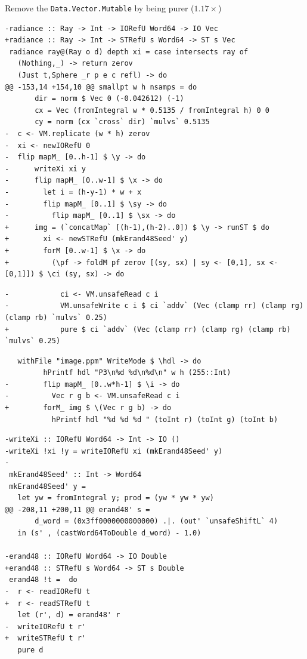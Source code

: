 \documentclass[8pt]{beamer}
\begin{document}


\begin{frame}[fragile]{Remove the \texttt{Data.Vector.Mutable} by being purer ($1.17\times$)}
\begin{verbatim}
-radiance :: Ray -> Int -> IORefU Word64 -> IO Vec
+radiance :: Ray -> Int -> STRefU s Word64 -> ST s Vec
 radiance ray@(Ray o d) depth xi = case intersects ray of
   (Nothing,_) -> return zerov
   (Just t,Sphere _r p e c refl) -> do
@@ -153,14 +154,10 @@ smallpt w h nsamps = do
       dir = norm $ Vec 0 (-0.042612) (-1)
       cx = Vec (fromIntegral w * 0.5135 / fromIntegral h) 0 0
       cy = norm (cx `cross` dir) `mulvs` 0.5135
-  c <- VM.replicate (w * h) zerov
-  xi <- newIORefU 0
-  flip mapM_ [0..h-1] $ \y -> do
-      writeXi xi y
-      flip mapM_ [0..w-1] $ \x -> do
-        let i = (h-y-1) * w + x
-        flip mapM_ [0..1] $ \sy -> do
-          flip mapM_ [0..1] $ \sx -> do
+      img = (`concatMap` [(h-1),(h-2)..0]) $ \y -> runST $ do
+        xi <- newSTRefU (mkErand48Seed' y)
+        forM [0..w-1] $ \x -> do
+          (\pf -> foldM pf zerov [(sy, sx) | sy <- [0,1], sx <- [0,1]]) $ \ci (sy, sx) -> do

\end{verbatim}

\begin{verbatim}
-            ci <- VM.unsafeRead c i
-            VM.unsafeWrite c i $ ci `addv` (Vec (clamp rr) (clamp rg) (clamp rb) `mulvs` 0.25)
+            pure $ ci `addv` (Vec (clamp rr) (clamp rg) (clamp rb) `mulvs` 0.25)
\end{verbatim}

\begin{verbatim}
   withFile "image.ppm" WriteMode $ \hdl -> do
         hPrintf hdl "P3\n%d %d\n%d\n" w h (255::Int)
-        flip mapM_ [0..w*h-1] $ \i -> do
-          Vec r g b <- VM.unsafeRead c i
+        forM_ img $ \(Vec r g b) -> do
           hPrintf hdl "%d %d %d " (toInt r) (toInt g) (toInt b)
\end{verbatim}

\begin{verbatim}
-writeXi :: IORefU Word64 -> Int -> IO ()
-writeXi !xi !y = writeIORefU xi (mkErand48Seed' y)
-
 mkErand48Seed' :: Int -> Word64
 mkErand48Seed' y =
   let yw = fromIntegral y; prod = (yw * yw * yw)
@@ -208,11 +200,11 @@ erand48' s =
       d_word = (0x3ff0000000000000) .|. (out' `unsafeShiftL` 4)
   in (s' , (castWord64ToDouble d_word) - 1.0)

-erand48 :: IORefU Word64 -> IO Double
+erand48 :: STRefU s Word64 -> ST s Double
 erand48 !t =  do
-  r <- readIORefU t
+  r <- readSTRefU t
   let (r', d) = erand48' r
-  writeIORefU t r'
+  writeSTRefU t r'
   pure d
\end{verbatim}
\end{frame}
\end{document}
